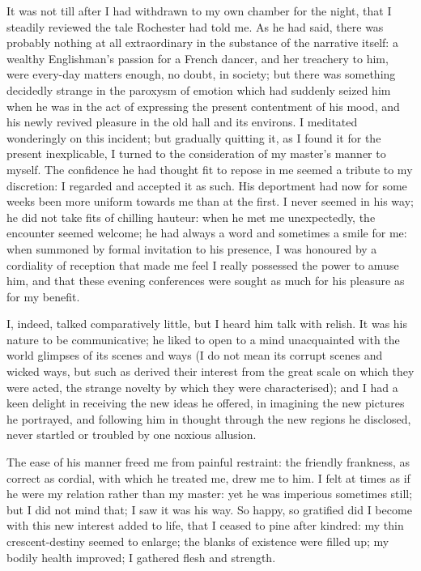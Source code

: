 It was not till after I had withdrawn to my own chamber for the night,
that I steadily reviewed the tale \Mr{} Rochester had told me. As he had
said, there was probably nothing at all extraordinary in the substance
of the narrative itself: a wealthy Englishman's passion for a French
dancer, and her treachery to him, were every-day matters enough, no
doubt, in society; but there was something decidedly strange in the
paroxysm of emotion which had suddenly seized him when he was in the act
of expressing the present contentment of his mood, and his newly revived
pleasure in the old hall and its environs. I meditated wonderingly on
this incident; but gradually quitting it, as I found it for the present
inexplicable, I turned to the consideration of my master's manner to
myself. The confidence he had thought fit to repose in me seemed a
tribute to my discretion: I regarded and accepted it as such. His
deportment had now for some weeks been more uniform towards me than at
the first. I never seemed in his way; he did not take fits of chilling
hauteur: when he met me unexpectedly, the encounter seemed welcome; he
had always a word and sometimes a smile for me: when summoned by formal
invitation to his presence, I was honoured by a cordiality of reception
that made me feel I really possessed the power to amuse him, and that
these evening conferences were sought as much for his pleasure as for my
benefit.

I, indeed, talked comparatively little, but I heard him talk with
relish. It was his nature to be communicative; he liked to open to a
mind unacquainted with the world glimpses of its scenes and ways (I do
not mean its corrupt scenes and wicked ways, but such as derived their
interest from the great scale on which they were acted, the strange
novelty by which they were characterised); and I had a keen delight in
receiving the new ideas he offered, in imagining the new pictures he
portrayed, and following him in thought through the new regions he
disclosed, never startled or troubled by one noxious allusion.

The ease of his manner freed me from painful restraint: the friendly
frankness, as correct as cordial, with which he treated me, drew me to
him. I felt at times as if he were my relation rather than my master:
yet he was imperious sometimes still; but I did not mind that; I saw it
was his way. So happy, so gratified did I become with this new interest
added to life, that I ceased to pine after kindred: my thin
crescent-destiny seemed to enlarge; the blanks of existence were filled
up; my bodily health improved; I gathered flesh and strength.

